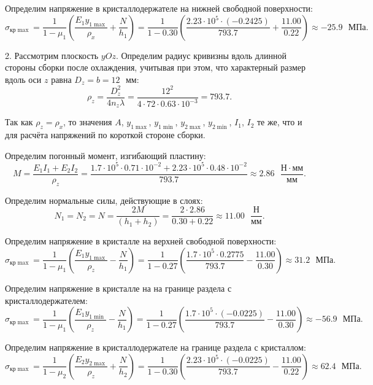 Определим напряжение в кристаллодержателе на нижней свободной поверхности:
\[
    \sigma_{кр \max} = \frac{1}{1 - \mu_1} \left(\frac{E_1 y_{1\max}}{\rho_x} + \frac{N}{h_1}\right)
                     = \frac{1}{1 - 0.30} \left(\frac{2.23 \cdot 10^5 \cdot (-0.2425)}{793.7} + \frac{11.00}{0.22}\right)
                     \approx -25.9\text{ } МПа.
\]

2. Рассмотрим плоскость $yOz$. Определим радиус кривизны вдоль длинной стороны сборки после охлаждения, учитывая при этом, что характерный размер вдоль оси $z$ равна $D_z = b = 12 \text{ } мм$:
\[
    \rho_z = \frac{D_z^2}{4 n_z \lambda}
           = \frac{12^2}{4 \cdot 72 \cdot 0.63 \cdot 10^{-3}}
           = 793.7.
\]

Так как $\rho_z = \rho_x$, то значения $A$, $y_{1 \max}$, $y_{1 \min}$, $y_{2 \max}$, $y_{2 \min}$, $I_1$, $I_2$ те же, что и для расчёта напряжений по короткой стороне сборки.

Определим погонный момент, изгибающий пластину:
\[
    M = \frac{E_1 I_1 + E_2 I_2}{\rho_z}
      = \frac{1.7 \cdot 10^5 \cdot 0.71 \cdot 10^{-2} + 2.23 \cdot 10^5 \cdot 0.48 \cdot 10^{-2}}{793.7}
      \approx 2.86 \text{ } \frac{Н \cdot мм}{мм}.
\]

Определим нормальные силы, действующие в слоях:
\[
    N_1 = N_2 = N
        = \frac{2M}{(h_1 + h_2)}
        = \frac{2 \cdot 2.86}{0.30 + 0.22}
        \approx 11.00 \text{ } \frac{Н}{мм}.
\]

Определим напряжение в кристалле на верхней свободной поверхности:
\[
    \sigma_{кр \max} = \frac{1}{1 - \mu_1} \left(\frac{E_1 y_{1\max}}{\rho_z} - \frac{N}{h_1}\right)
                     = \frac{1}{1 - 0.27} \left(\frac{1.7 \cdot 10^5 \cdot 0.2775}{793.7} - \frac{11.00}{0.30}\right)
                     \approx 31.2 \text{ } МПа.
\]

Определим напряжение в кристалле на на границе раздела с кристаллодержателем:
\[
    \sigma_{кр \max} = \frac{1}{1 - \mu_1} \left(\frac{E_1 y_{1\min}}{\rho_z} - \frac{N}{h_1}\right)
                     = \frac{1}{1 - 0.27} \left(\frac{1.7 \cdot 10^5 \cdot (-0.0225)}{793.7} - \frac{11.00}{0.30}\right)
                     \approx -56.9\text{ } МПа.
\]

Определим напряжение в кристаллодержателе на границе раздела с кристаллом:
\[
    \sigma_{кр \max} = \frac{1}{1 - \mu_2} \left(\frac{E_2 y_{2\max}}{\rho_z} + \frac{N}{h_2}\right)
                     = \frac{1}{1 - 0.30} \left(\frac{2.23 \cdot 10^5 \cdot (-0.0225)}{793.7} - \frac{11.00}{0.22}\right)
                     \approx 62.4\text{ } МПа.
\]

